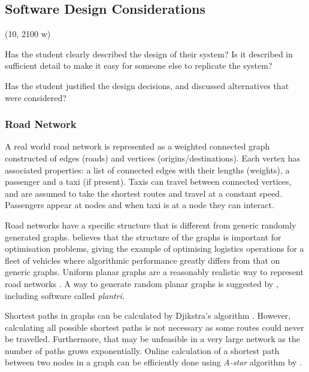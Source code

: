 \subsection{Software Design Considerations}

(10, 2100 w)

Has the student clearly described the design of their system? Is it described
in sufficient detail to make it easy for someone else to replicate the system?

Has the student justified the design decisions, and discussed alternatives that
were considered?


\subsubsection{Road Network}
\label{sec:design:network}

A real world road network is represented as a weighted connected graph
constructed of edges (roads) and vertices (origins/destinations). Each vertex
has associated properties: a list of connected edges with their lengths
(weights), a passenger and a taxi (if present). Taxis can travel between
connected vertices, and are assumed to take the shortest routes and travel at a
constant speed. Passengers appear at nodes and when taxi is at a node  they can
interact.

Road networks have a specific structure that is different from generic randomly
generated graphs. \textcite{Eisenstat2011graphs+quadtree} believes that the
structure of the graphs is important for optimisation problems, giving the
example of optimising logistics operations for a fleet of vehicles where
algorithmic performance greatly differs from that on generic graphs. Uniform
planar graphs are a reasonably realistic way to represent road networks
\parencite{Eisenstat2011graphs+quadtree, Masucci2009graphs+london}. A way to
generate random planar graphs is suggested by
\textcite{Brinkmann2007graphs+generate}, including software called
\textit{plantri}.

Shortest paths in graphs can be calculated by Djikstra's algorithm
\parencite{Cormen2009algorithms}. However, calculating all possible shortest
paths is not necessary as some routes could never be travelled. Furthermore,
that may be unfeasible in a very large network as the number of paths grows
exponentially. Online calculation of a shortest path between two nodes in a
graph can be efficiently done using \textit{A-star} algorithm by
\textcite{Hart1968paths}.

